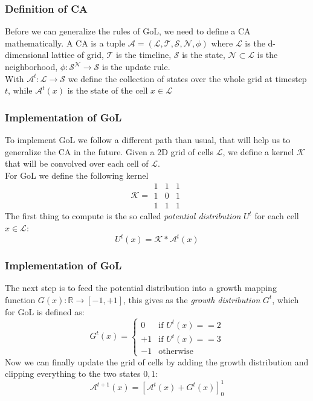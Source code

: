 \documentclass{beamer}
\begin{document}
\begin{frame}
  \frametitle{Definition of CA}
  Before we can generalize the rules of GoL, we need to define a CA
  mathematically. A CA is a tuple $\mathcal{A} = (\mathcal{L}, \mathcal{T},
  \mathcal{S}, \mathcal{N}, \phi)$ where $\mathcal{L}$ is the d-dimensional
  lattice of grid, $\mathcal{T}$ is the timeline, $\mathcal{S}$ is the state,
  $\mathcal{N} \subset \mathcal{L}$ is the neighborhood, $\phi :
  \mathcal{S}^{\mathcal{N}} \rightarrow \mathcal{S}$ is the update rule.\\
  With $\mathcal{A}^t : \mathcal{L} \rightarrow \mathcal{S}$ we define the
  collection of states over the whole grid at timestep $t$, while
  $\mathcal{A}^t(x)$ is the state of the cell $x \in \mathcal{L}$
\end{frame}

\begin{frame}
  \frametitle{Implementation of GoL}
  To implement GoL we follow a different path than usual, that will help us to
  generalize the CA in the future. Given a 2D grid of cells $\mathcal{L}$, we
  define a kernel $\mathcal{K}$ that will be convolved over each cell of
  $\mathcal{L}$.\\For GoL we define the following kernel
  \begin{equation}
    \mathcal{K} = \begin{array}{ccc}
      1 & 1 & 1\\
      1 & 0 & 1\\
      1 & 1 & 1
    \end{array}
  \end{equation}
  The first thing to compute is the so called \emph{potential distribution} $U^t$ for each cell $x \in \mathcal{L}$:
  \begin{equation}
    U^{t}(x) = \mathcal{K} * \mathcal{A}^t(x)
  \end{equation}
\end{frame}

\begin{frame}
  \frametitle{Implementation of GoL}
  The next step is to feed the potential distribution into a growth mapping
  function $G(x): \mathbb{R} \rightarrow [-1, +1]$, this gives as the
  \emph{growth distribution} $G^t$, which for GoL is defined as:
  \begin{equation}
    G^{t}(x) = \begin{cases}
      0 & \text{if } U^{t}(x) == 2\\
      +1 & \text{if } U^{t}(x) == 3\\
      -1 & \text{otherwise}
    \end{cases}
  \end{equation}
  Now we can finally update the grid of cells by adding the growth distribution
  and clipping everything to the two states ${0, 1}$:
  \begin{equation}\label{eq:gol-update}
    \mathcal{A}^{t+1}(x) = [\mathcal{A}^t(x) + G^{t}(x)]^1_0
  \end{equation}
\end{frame}
\end{document}

